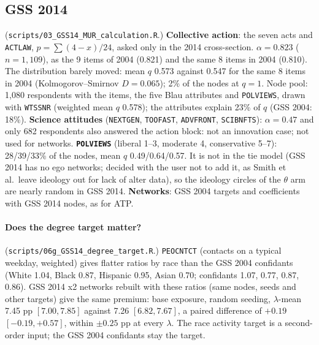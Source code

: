 \documentclass[11pt,a4paper]{article}
\newcommand{\code}[1]{\texttt{#1}}
\begin{document}
\subsection{GSS 2014}
\label{sec:pr5gss14}

(\code{scripts/03\_GSS14\_MUR\_calculation.R}.) \textbf{Collective action}: the seven acts and
\code{ACTLAW}, $p = \sum (4 - x)/24$, asked only in the 2014 cross-section. $\alpha = 0.823$
($n = 1{,}109$), as the 9 items of 2004 (0.821) and the same 8 items in 2004 (0.810). The
distribution barely moved: mean $q$ 0.573 against 0.547 for the same 8 items in 2004
(Kolmogorov--Smirnov $D = 0.065$); 2\% of the nodes at $q = 1$. Node pool: 1{,}080 respondents with
the items, the five Blau attributes and \code{POLVIEWS}, drawn with \code{WTSSNR} (weighted mean $q$
0.578); the attributes explain 23\% of $q$ (GSS 2004: 18\%). \textbf{Science attitudes} (\code{NEXTGEN},
\code{TOOFAST}, \code{ADVFRONT}, \code{SCIBNFTS}): $\alpha = 0.47$ and only 682 respondents also answered
the action block: not an innovation case; not used for networks. \textbf{\code{POLVIEWS}} (liberal 1--3,
moderate 4, conservative 5--7): 28/39/33\% of the nodes, mean $q$ 0.49/0.64/0.57. It is not in the tie
model (GSS 2014 has no ego networks; decided with the user not to add it, as Smith et al.\ leave ideology
out for lack of alter data), so the ideology circles of the $\theta$ arm are nearly random in GSS 2014.
\textbf{Networks}: GSS 2004 targets and coefficients with GSS 2014 nodes, as for ATP.

\paragraph{Does the degree target matter?} (\code{scripts/06g\_GSS14\_degree\_target.R}.) \code{PEOCNTCT}
(contacts on a typical weekday, weighted) gives flatter ratios by race than the GSS 2004 confidants (White
1.04, Black 0.87, Hispanic 0.95, Asian 0.70; confidants 1.07, 0.77, 0.87, 0.86). GSS 2014 x2 networks rebuilt
with these ratios (same nodes, seeds and other targets) give the same premium: base exposure, random
seeding, $\lambda$-mean 7.45 pp $[7.00, 7.85]$ against 7.26 $[6.82, 7.67]$, a paired difference of $+0.19$
$[-0.19, +0.57]$, within $\pm 0.25$ pp at every $\lambda$. The race activity target is a second-order
input; the GSS 2004 confidants stay the target.

\end{document}
